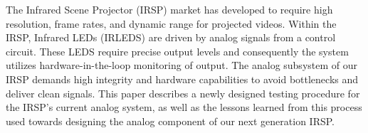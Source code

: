 The Infrared Scene Projector (IRSP) market has developed to require high resolution, frame rates, and dynamic range for projected videos. Within the IRSP, Infrared LEDs (IRLEDS) are driven by analog signals from a control circuit. These LEDS require precise output levels and consequently the system utilizes hardware-in-the-loop monitoring of output. The analog subsystem of our IRSP demands high integrity and hardware capabilities to avoid bottlenecks and deliver clean signals. This paper describes a newly designed testing procedure for the IRSP's current analog system, as well as the lessons learned from this process used towards designing the analog component of our next generation IRSP.
